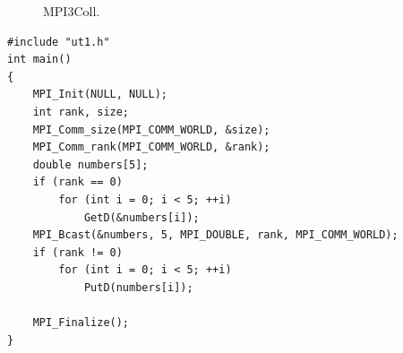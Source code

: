 \begin{figure}[htbp]%
    \centering
    \hfill%
    \caption{MPI3Coll.}%
    \label{mpi3coll}%
\end{figure}

\lstset{language=c++}
\begin{lstlisting}
#include "ut1.h"
int main()
{
	MPI_Init(NULL, NULL);
	int rank, size;
	MPI_Comm_size(MPI_COMM_WORLD, &size);
	MPI_Comm_rank(MPI_COMM_WORLD, &rank);
	double numbers[5];
	if (rank == 0)
		for (int i = 0; i < 5; ++i)
			GetD(&numbers[i]);
	MPI_Bcast(&numbers, 5, MPI_DOUBLE, rank, MPI_COMM_WORLD);
	if (rank != 0)
		for (int i = 0; i < 5; ++i)
			PutD(numbers[i]);

	MPI_Finalize();
}
\end{lstlisting}

